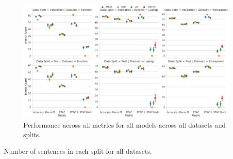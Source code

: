 \begin{figure}[ht!]
    \centering
    \includegraphics[scale=0.38]{images/augmentation/methods_performance/baseline/baseline_stac_scores.pdf}
    \caption{Performance across all metrics for all models across all datasets and splits.}
    \label{fig:baseline_stac_scores.png}
\end{figure}

\begin{table}[ht!]
    \centering
    
    \caption{Number of sentences in each split for all datasets.}
    \label{tab:aug_STAC_samples_stats}
\end{table}

\FloatBarrier
